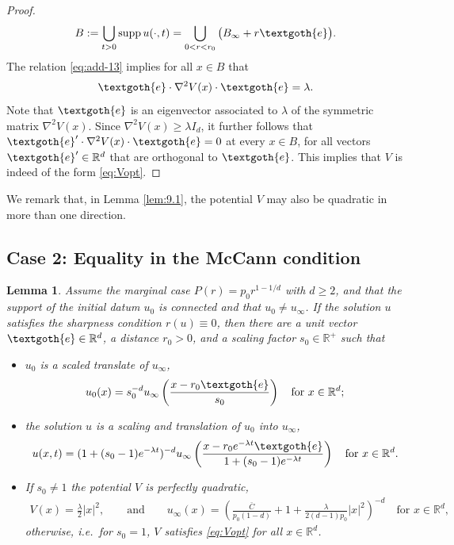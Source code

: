 \documentclass[reqno]{amsart}
\newtheorem{lemma}{Lemma}[section]
\newcommand{\R}{\mathbb{R}}
\begin{document}
\begin{proof}
  \begin{align*}
    B:=\bigcup_{t>0}\operatorname{supp}u(\cdot,t) = \bigcup_{0<r<r_0}\big(B_\infty+r\textgoth{e}\big).
  \end{align*}
  The relation \eqref{eq:add-13} implies for all $x\in B$ that
  \begin{align*}
    \textgoth{e}\cdot\nabla^2V(x)\cdot\textgoth{e} = \lambda.
  \end{align*}
  Note that $\textgoth{e}$ is an eigenvector associated to $\lambda$ of the symmetric matrix $\nabla^2V(x)$.
  Since $\nabla^2V(x)\ge\lambda I_d$, it further follows that $\textgoth{e}'\cdot\nabla^2V(x)\cdot \textgoth{e}=0$ at every $x\in B$, for all vectors $\textgoth{e}'\in\R^d$ that are orthogonal to $\textgoth{e}$. This implies that $V$ is indeed of the form \eqref{eq:Vopt}.
\end{proof}
We remark that, in Lemma \ref{lem:9.1}, the potential $V$ may also be quadratic in more than one direction.

\subsection{Case 2: Equality in the McCann condition}
%
\begin{lemma}\label{lem:9.2}
  Assume the marginal case $P(r)=p_0r^{1-1/d}$ with $d\ge2$, and that the support of the initial datum $u_0$ is connected and that $u_0\neq u_\infty$.
  If the solution $u$ 
  satisfies the sharpness condition $r(u)\equiv0$, 
  then there are a unit vector $\textgoth{e}\in\R^d$, a distance $r_0>0$, and a scaling factor $s_0\in\R^+
  $ such that
  \begin{itemize}
  \item[(a)] $u_0$ is a scaled translate of $u_\infty$,
    \begin{align}
      \label{eq:u0opt2}
      u_0(x)=s_0^{-d}u_\infty\left(\frac{x-r_0\textgoth{e}}{s_0}\right)\quad \mbox{for } x\in\R^d;
    \end{align}
  \item[(b)] the solution $u$ is a scaling and translation of $u_0$ into $u_\infty$,
    \begin{align}
      \label{eq:uopt2}
      u(x,t) = (1+(s_0-1)e^{-\lambda t})^{-d}u_\infty\left(\frac{x-r_0e^{-\lambda t}\textgoth{e}}{1+(s_0-1)e^{-\lambda t}}\right)\quad \mbox{for } x\in\R^d.
    \end{align}
  \item[(c)] If $s_0\neq 1$ the potential $V$ is perfectly quadratic,
    \begin{align}
      \label{eq:Vopt2}
      V(x)=\frac\lambda2|x|^2,
      \qquad \mbox{and} \qquad u_\infty(x) = \left(\frac{\bar C}{p_0(1-d)}+1+\frac{\lambda}{2(d-1)p_0}|x|^2\right)^{-d}\quad \mbox{for } x\in\R^d,
    \end{align}
    otherwise, i.e.\ for $s_0=1$, $V$ satisfies \eqref{eq:Vopt} for all $x\in\R^d$.
 \end{itemize}  
\end{lemma}
\end{document}
